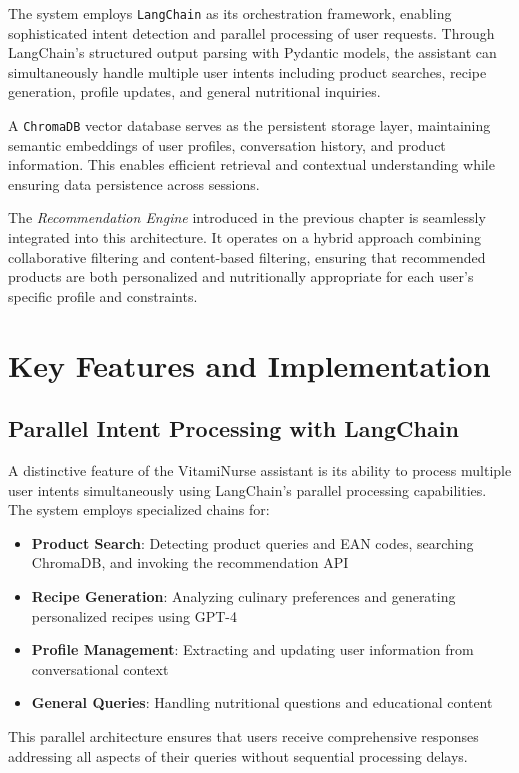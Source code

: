 The system employs \texttt{LangChain} as its orchestration framework, enabling sophisticated intent detection and parallel processing of user requests. Through LangChain's structured output parsing with Pydantic models, the assistant can simultaneously handle multiple user intents including product searches, recipe generation, profile updates, and general nutritional inquiries.

A \texttt{ChromaDB} vector database serves as the persistent storage layer, maintaining semantic embeddings of user profiles, conversation history, and product information. This enables efficient retrieval and contextual understanding while ensuring data persistence across sessions.

The \emph{Recommendation Engine} introduced in the previous chapter is seamlessly integrated into this architecture. It operates on a hybrid approach combining collaborative filtering and content-based filtering, ensuring that recommended products are both personalized and nutritionally appropriate for each user's specific profile and constraints.

\section{Key Features and Implementation}

\subsection{Parallel Intent Processing with LangChain}
A distinctive feature of the VitamiNurse assistant is its ability to process multiple user intents simultaneously using LangChain's parallel processing capabilities. The system employs specialized chains for:
\begin{itemize}
\item \textbf{Product Search}: Detecting product queries and EAN codes, searching ChromaDB, and invoking the recommendation API
\item \textbf{Recipe Generation}: Analyzing culinary preferences and generating personalized recipes using GPT-4
\item \textbf{Profile Management}: Extracting and updating user information from conversational context
\item \textbf{General Queries}: Handling nutritional questions and educational content
\end{itemize}

This parallel architecture ensures that users receive comprehensive responses addressing all aspects of their queries without sequential processing delays.

